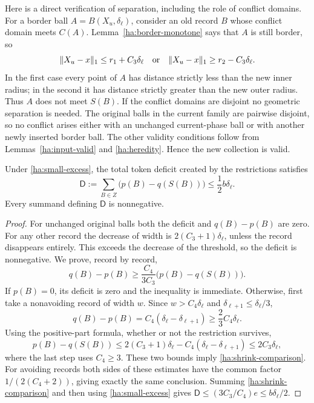 Here is a direct verification of separation, including the role
of conflict domains.  For a border ball $A=B(X_u,\delta_\ell)$,
consider an old record $B$ whose conflict domain meets $C(A)$.
Lemma~\ref{ha:border-monotone} says that $A$ is still border, so
\[
 \|X_u-x\|_1\le r_1+C_3\delta_\ell
 \quad\hbox{or}\quad
 \|X_u-x\|_1\ge r_2-C_3\delta_\ell.
\]
In the first case every point of $A$ has distance strictly less
than the new inner radius; in the second it has distance strictly
greater than the new outer radius.  Thus $A$ does not meet $S(B)$.
If the conflict domains are disjoint no geometric separation is needed.
The original balls in the current family are pairwise disjoint,
so no conflict arises either with an unchanged current-phase ball
or with another newly inserted border ball.  The other validity
conditions follow from Lemmas~\ref{ha:input-valid} and
\ref{ha:heredity}.  Hence the new collection is valid.

\begin{lemma}\label{ha:shrink-cost}
Under \eqref{ha:small-excess}, the total token deficit created by
the restrictions satisfies
\[
 \mathsf D:=\sum_{B\in Z}\bigl(p(B)-q(S(B))\bigr)
 \le\frac12 b\delta_\ell.
\]
Every summand defining $\mathsf D$ is nonnegative.
\end{lemma}
\begin{proof}
For unchanged original balls both the deficit and $q(B)-p(B)$
are zero.  For any other record the decrease of width is
$2(C_3+1)\delta_\ell$, unless the record disappears entirely.
This exceeds the decrease of the threshold, so the deficit is
nonnegative.  We prove, record by record,
\begin{equation}\label{ha:shrink-comparison}
 q(B)-p(B)\ge\frac{C_4}{3C_3}
                   \bigl(p(B)-q(S(B))\bigr).
\end{equation}
If $p(B)=0$, its deficit is zero and the inequality is immediate.
Otherwise, first take a nonavoiding record of width $w$.
Since $w>C_4\delta_\ell$ and
$\delta_{\ell+1}\le\delta_\ell/3$,
\[
 q(B)-p(B)=C_4(\delta_\ell-\delta_{\ell+1})
             \ge\frac23 C_4\delta_\ell.
\]
Using the positive-part formula, whether or not the restriction
survives,
\[
 p(B)-q(S(B))
 \le2(C_3+1)\delta_\ell-C_4(\delta_\ell-\delta_{\ell+1})
 \le2C_3\delta_\ell,
\]
where the last step uses $C_4\ge3$.
These two bounds imply \eqref{ha:shrink-comparison}.
For avoiding records both sides of these estimates have the common
factor $1/(2(C_4+2))$, giving exactly the same conclusion.
Summing \eqref{ha:shrink-comparison} and then using
\eqref{ha:small-excess} gives
$\mathsf D\le(3C_3/C_4)e\le b\delta_\ell/2$.
\end{proof}

